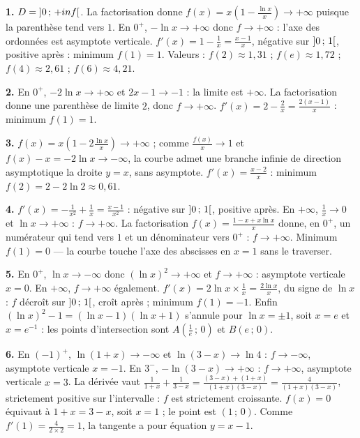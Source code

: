 \begin{corrige}[annales]
\textbf{1.} $D = \left]0\,;\,+inf\right[$. La factorisation donne
$f(x) = x\left(1-\frac{\ln x}{x}\right) \to +\infty$ puisque la parenthèse
tend vers $1$. En $0^{+}$, $-\ln x \to +\infty$ donc $f \to +\infty$ :
l'axe des ordonnées est asymptote verticale. $f'(x) = 1-\frac1x
= \frac{x-1}{x}$, négative sur $\left]0\,;\,1\right[$, positive après :
minimum $f(1) = 1$. Valeurs : $f(2) \approx 1{,}31$ ; $f(e) \approx 1{,}72$ ;
$f(4) \approx 2{,}61$ ; $f(6) \approx 4{,}21$.

\textbf{2.} En $0^{+}$, $-2\ln x \to +\infty$ et $2x-1 \to -1$ : la limite
est $+\infty$. La factorisation donne une parenthèse de limite $2$, donc
$f \to +\infty$. $f'(x) = 2-\frac2x = \frac{2(x-1)}{x}$ : minimum
$f(1) = 1$.

\textbf{3.} $f(x) = x\left(1-2\frac{\ln x}{x}\right) \to +\infty$ ; comme
$\frac{f(x)}{x} \to 1$ et $f(x)-x = -2\ln x \to -\infty$, la courbe admet
une branche infinie de direction asymptotique la droite $y = x$, sans
asymptote. $f'(x) = \frac{x-2}{x}$ : minimum $f(2) = 2-2\ln2 \approx 0{,}61$.

\textbf{4.} $f'(x) = -\frac{1}{x^{2}}+\frac1x = \frac{x-1}{x^{2}}$ :
négative sur $\left]0\,;\,1\right[$, positive après. En $+\infty$,
$\frac1x \to 0$ et $\ln x \to +\infty$ : $f \to +\infty$. La factorisation
$f(x) = \frac{1-x+x\ln x}{x}$ donne, en $0^{+}$, un numérateur qui tend vers
$1$ et un dénominateur vers $0^{+}$ : $f \to +\infty$. Minimum
$f(1) = 0$ — la courbe touche l'axe des abscisses en $x = 1$ sans le
traverser.

\textbf{5.} En $0^{+}$, $\ln x \to -\infty$ donc $(\ln x)^{2} \to +\infty$ et
$f \to +\infty$ : asymptote verticale $x = 0$. En $+\infty$,
$f \to +\infty$ également. $f'(x) = 2\ln x\times\frac1x
= \frac{2\ln x}{x}$, du signe de $\ln x$ : $f$ décroît sur
$\left]0\,;\,1\right[$, croît après ; minimum $f(1) = -1$. Enfin
$(\ln x)^{2}-1 = (\ln x-1)(\ln x+1)$ s'annule pour $\ln x = \pm1$, soit
$x = e$ et $x = e^{-1}$ : les points d'intersection sont
$A\left(\frac1e\,;\,0\right)$ et $B(e\,;\,0)$.

\textbf{6.} En $(-1)^{+}$, $\ln(1+x) \to -\infty$ et $\ln(3-x) \to \ln4$ :
$f \to -\infty$, asymptote verticale $x = -1$. En $3^{-}$,
$-\ln(3-x) \to +\infty$ : $f \to +\infty$, asymptote verticale $x = 3$. La
dérivée vaut
$\frac{1}{1+x}+\frac{1}{3-x} = \frac{(3-x)+(1+x)}{(1+x)(3-x)}
= \frac{4}{(1+x)(3-x)}$, strictement positive sur l'intervalle : $f$ est
strictement croissante. $f(x) = 0$ équivaut à $1+x = 3-x$, soit $x = 1$ ; le
point est $(1\,;\,0)$. Comme $f'(1) = \frac{4}{2\times2} = 1$, la tangente a
pour équation $y = x-1$.


\end{corrige}
